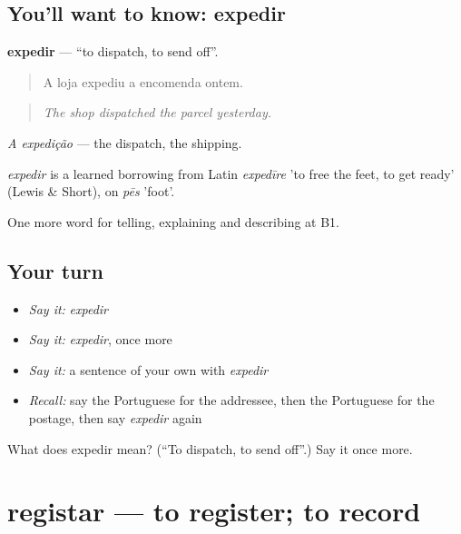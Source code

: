 \subsection*{You'll want to know: expedir}
\textbf{expedir} — \textquotedblleft{}to dispatch, to send off\textquotedblright{}.

\begin{quote}
A loja expediu a encomenda ontem.
\end{quote}

\begin{quote}
\emph{The shop dispatched the parcel yesterday.}
\end{quote}

\emph{A expedição} — the dispatch, the shipping.

\begin{cousinweb}
\emph{expedir} is a learned borrowing from Latin \emph{expedīre} 'to free the feet, to get ready' (Lewis \& Short), on \emph{pēs} 'foot'.
\end{cousinweb}

\begin{grammarlens}[title={What you've built}]
One more word for telling, explaining and describing at B1.
\end{grammarlens}

\subsection*{Your turn}
\begin{itemize}
\raggedright
  \item \emph{Say it:} \emph{expedir}
  \item \emph{Say it:} \emph{expedir}, once more
  \item \emph{Say it:} a sentence of your own with \emph{expedir}
  \item \emph{Recall:} say the Portuguese for the addressee, then the Portuguese for the postage, then say \emph{expedir} again
\end{itemize}

\begin{tcolorbox}[breakable,colback=teal!4,colframe=teal!35!black,title={Before you move on}]
What does expedir mean? (\textquotedblleft{}To dispatch, to send off\textquotedblright{}.) Say it once more.
\end{tcolorbox}
\section[registar]{registar — to register; to record}

